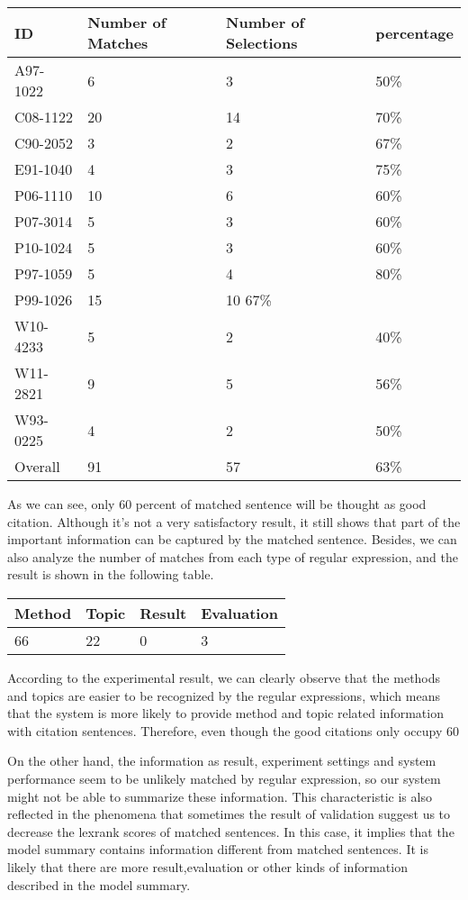 \documentclass[hyp]{socreport}
\begin{document}
\begin{tabular}[t]{llll}
\hline
ID & Number of Matches & Number of Selections & percentage\\
\hline
A97-1022 & 6 & 3 & 50\%\\
C08-1122 & 20 & 14 & 70\%\\
C90-2052 & 3 & 2 & 67\% \\
E91-1040 & 4 & 3 & 75\% \\
P06-1110 & 10 & 6 & 60\% \\
P07-3014 & 5 & 3 & 60\% \\
P10-1024 & 5 & 3 & 60\% \\
P97-1059 & 5 & 4 & 80\% \\
P99-1026 & 15 & 10 67\%\\
W10-4233 & 5 & 2 & 40\% \\
W11-2821 & 9 & 5 & 56\%  \\
W93-0225 & 4 & 2 & 50\% \\
Overall &  91 & 57 & 63\% \\

\hline
\end{tabular} 

As we can see, only 60 percent of matched sentence will be thought as good citation. Although it’s not a very satisfactory result, it still shows that part of the important information can be captured by the matched sentence. Besides, we can also analyze the number of matches from each type of regular expression, and the result is shown in the following table.
\begin{tabular}[t]{llll}
\hline
Method & Topic & Result & Evaluation \\
\hline
66 & 22 & 0 & 3 \\
\hline
\end{tabular} 

According to the experimental result, we can clearly observe that the methods and topics are easier to be recognized by the regular expressions, which means that the system is more likely to provide method and topic related information with citation sentences. Therefore, even though the good citations only occupy 60%

On the other hand, the information as result, experiment settings and system performance seem to be unlikely matched by regular expression, so our system might not be able to summarize these information. This characteristic is also reflected in the phenomena that sometimes the result of validation suggest us to decrease the lexrank scores of matched sentences. In this case, it implies that the model summary contains information different from matched sentences. It is likely that there are more result,evaluation or other kinds of information described in the model summary. 
\end{document}
